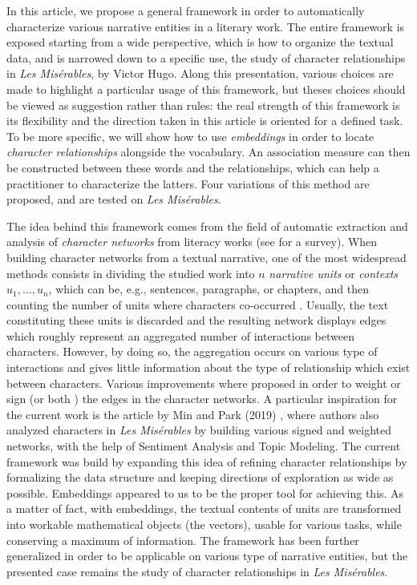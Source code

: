 \documentclass[
twocolumn,
]{ceurart}
\begin{document}
In this article, we propose a general framework in order to automatically characterize various narrative entities in a literary work. The entire framework is exposed starting from a wide perspective, which is how to organize the textual data, and is narrowed down to a specific use, the study of character relationships in \emph{Les Misérables}, by Victor Hugo. Along this presentation, various choices are made to highlight a particular usage of this framework, but theses choices should be viewed as suggestion rather than rules: the real strength of this framework is its flexibility and the direction taken in this article is oriented for a defined task. To be more specific, we will show how to use \emph{embeddings} in order to locate \emph{character relationships} alongside the vocabulary. An association measure can then be constructed between these words and the relationships, which can help a practitioner to characterize the latters. Four variations of this method are proposed, and are tested on \emph{Les Misérables}.

The idea behind this framework comes from the field of automatic extraction and analysis of \emph{character networks} from literacy works (see \cite{Labatut2019} for a survey). When building character networks from a textual narrative, one of the most widespread methods consists in dividing the studied work into $n$ \emph{narrative units} or \emph{contexts} $u_1, \ldots, u_n$, which can be, e.g., sentences, paragraphs, or chapters, and then counting the number of units where characters co-occurred \cite{Elsner2012, Lee2012, Rochat2014, Grener2017, Min2019}. Usually, the text constituting these units is discarded and the resulting network displays edges which roughly represent an aggregated number of interactions between characters. However, by doing so, the aggregation occurs on various type of interactions and gives little information about the type of relationship which exist between characters. Various improvements where proposed in order to weight \cite{Sack2014} or sign \cite{Krishnan2015} (or both \cite{Min2019}) the edges in the character networks. A particular inspiration for the current work is the article by Min and Park (2019) \cite{Min2019}, where authors also analyzed characters in \emph{Les Misérables} by building various signed and weighted networks, with the help of Sentiment Analysis and Topic Modeling. The current framework was build by expanding this idea of refining character relationships by formalizing the data structure and keeping directions of exploration as wide as possible. Embeddings \cite{Incitti2023} appeared to us to be the proper tool for achieving this. As a matter of fact, with embeddings, the textual contents of units are transformed into workable mathematical objects (the vectors), usable for various tasks, while conserving a maximum of information. The framework has been further generalized in order to be applicable on various type of narrative entities, but the presented case remains the study of character relationships in \emph{Les Misérables}. 
\end{document}
